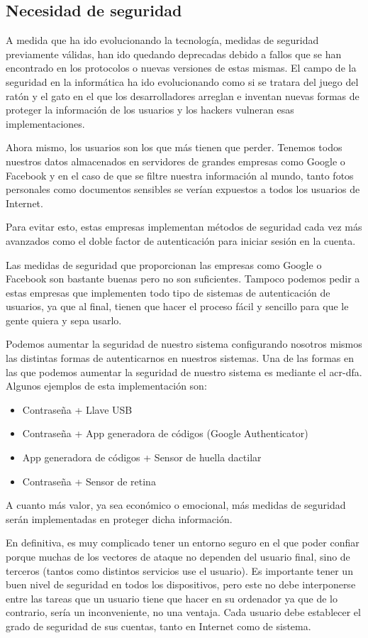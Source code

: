 \documentclass[twoside, titlepage, 12pt, a4paper]{article}
\begin{document}
\subsection{Necesidad de seguridad}
A medida que ha ido evolucionando la tecnología, medidas de seguridad previamente válidas, han ido quedando deprecadas debido a fallos que se han encontrado en los protocolos o nuevas versiones de estas mismas. El campo de la seguridad en la informática ha ido evolucionando como si se tratara del juego del ratón y el gato en el que los desarrolladores arreglan e inventan nuevas formas de proteger la información de los usuarios y los hackers vulneran esas implementaciones.\par Ahora mismo, los usuarios son los que más tienen que perder. Tenemos todos nuestros datos almacenados en servidores de grandes empresas como Google o Facebook y en el caso de que se filtre nuestra información al mundo, tanto fotos personales como documentos sensibles se verían expuestos a todos los usuarios de Internet.\par Para evitar esto, estas empresas implementan métodos de seguridad cada vez más avanzados como el doble factor de autenticación para iniciar sesión en la cuenta.\par Las medidas de seguridad que proporcionan las empresas como Google o Facebook son bastante buenas pero no son suficientes. Tampoco podemos pedir a estas empresas que implementen todo tipo de sistemas de autenticación de usuarios, ya que al final, tienen que hacer el proceso fácil y sencillo para que le gente quiera y sepa usarlo.\par Podemos aumentar la seguridad de nuestro sistema configurando nosotros mismos las distintas formas de autenticarnos en nuestros sistemas. Una de las formas en las que podemos aumentar la seguridad de nuestro sistema es mediante el \gls{acr-dfa}. Algunos ejemplos de esta implementación son:
\begin{itemize}
	\item Contraseña + Llave USB
	\item Contraseña + App generadora de códigos (Google Authenticator)
	\item App generadora de códigos + Sensor de huella dactilar
	\item Contraseña + Sensor de retina
\end{itemize}
A cuanto más valor, ya sea económico o emocional, más medidas de seguridad serán implementadas en proteger dicha información.\par
En definitiva, es muy complicado tener un entorno seguro en el que poder confiar porque muchas de los vectores de ataque no dependen del usuario final, sino de terceros (tantos como distintos servicios use el usuario). Es importante tener un buen nivel de seguridad en todos los dispositivos, pero este no debe interponerse entre las tareas que un usuario tiene que hacer en su ordenador ya que de lo contrario, sería un inconveniente, no una ventaja. Cada usuario debe establecer el grado de seguridad de sus cuentas, tanto en Internet como de sistema.\par
\end{document}
